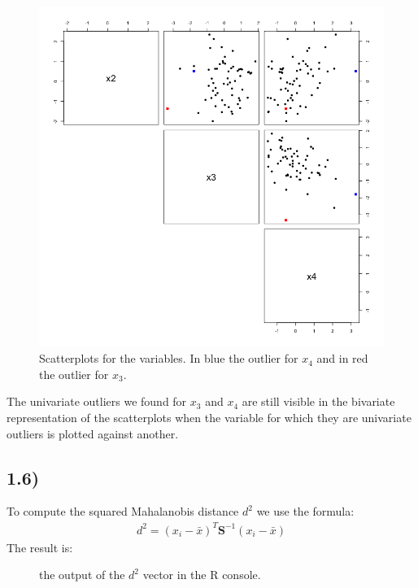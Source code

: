 \documentclass[a4paper,11pt,oneside]{report}
\begin{document}
	\begin{figure}[H]
	\centering
	\includegraphics[scale = 0.5]{pairs_scatterplot1_ex1.png}
	\caption{Scatterplots for the variables. In blue the outlier for $x_4$ and in red the outlier for $x_3$.}
	\end{figure}
	The univariate outliers we found for $x_3$ and $x_4$ are still visible in the bivariate representation of the scatterplots when the variable for which they are univariate outliers is plotted against another.

\subsection*{1.6)}
	To compute the squared Mahalanobis distance $d^2$ we use the formula:
	\begin{align}
	d^2 = (x_i - \bar x)^T \mathbf{S}^{-1} (x_i - \bar x)
	\end{align}
	The result is:
	\begin{figure}[H]
	
	\caption{the output of the $d^2$ vector in the R console.}
	\end{figure}
\end{document}
